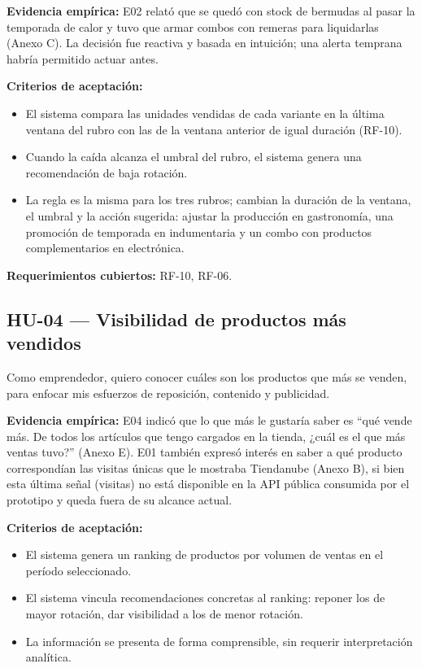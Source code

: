 \noindent\textbf{Evidencia empírica:} E02 relató que se quedó con stock de bermudas al pasar la temporada de calor y tuvo que armar combos con remeras para liquidarlas (Anexo C). La decisión fue reactiva y basada en intuición; una alerta temprana habría permitido actuar antes.

\noindent\textbf{Criterios de aceptación:}
\begin{itemize}
    \item El sistema compara las unidades vendidas de cada variante en la última ventana del rubro con las de la ventana anterior de igual duración (RF-10).
    \item Cuando la caída alcanza el umbral del rubro, el sistema genera una recomendación de baja rotación.
    \item La regla es la misma para los tres rubros; cambian la duración de la ventana, el umbral y la acción sugerida: ajustar la producción en gastronomía, una promoción de temporada en indumentaria y un combo con productos complementarios en electrónica.
\end{itemize}

\noindent\textbf{Requerimientos cubiertos:} RF-10, RF-06.

\subsection{HU-04 --- Visibilidad de productos más vendidos}
\label{sec:hu-04}

Como emprendedor, quiero conocer cuáles son los productos que más se venden, para enfocar mis esfuerzos de reposición, contenido y publicidad.

\noindent\textbf{Evidencia empírica:} E04 indicó que lo que más le gustaría saber es \enquote{qué vende más. De todos los artículos que tengo cargados en la tienda, ¿cuál es el que más ventas tuvo?} (Anexo E). E01 también expresó interés en saber a qué producto correspondían las visitas únicas que le mostraba Tiendanube (Anexo B), si bien esta última señal (visitas) no está disponible en la API pública consumida por el prototipo y queda fuera de su alcance actual.

\noindent\textbf{Criterios de aceptación:}
\begin{itemize}
    \item El sistema genera un ranking de productos por volumen de ventas en el período seleccionado.
    \item El sistema vincula recomendaciones concretas al ranking: reponer los de mayor rotación, dar visibilidad a los de menor rotación.
    \item La información se presenta de forma comprensible, sin requerir interpretación analítica.
\end{itemize}


